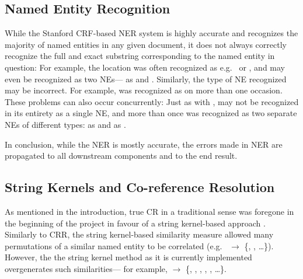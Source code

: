 
\subsection {Named Entity Recognition}
\label{sec:named_entity_recognition}
While the Stanford CRF-based NER system is highly accurate and recognizes the majority of named entities in any given document, it does not always correctly recognize the full and exact substring corresponding to the named entity in question: For example, the location  was often recognized as e.g.\   or , and may even be recognized as two NEs--- as  and . Similarly, the type of NE recognized may be incorrect. For example,  was recognized as  on more than one occasion. These problems can also occur concurrently: Just as with ,  may not be recognized in its entirety as a single NE, and more than once was recognized as two separate NEs of different types:  as  and  as .



In conclusion, while the NER is mostly accurate, the errors made in NER are propagated to all downstream components and to the end result.

\subsection {String Kernels and Co-reference Resolution}
\label{sec:string_kernels_and_co-reference_resolution}
As mentioned in the introduction, true CR in a traditional sense was foregone in the beginning of the project in favour of a string kernel-based approach . Similarly to CRR, the string kernel-based similarity measure allowed many permutations of a similar named entity to be correlated (e.g.\ \textbf{} $\rightarrow$ \{, ,  \ldots\}). However, the the string kernel method as it is currently implemented overgenerates such similarities--- for example, \textbf{} $\rightarrow$ \{, , , , ,  \ldots\}.

